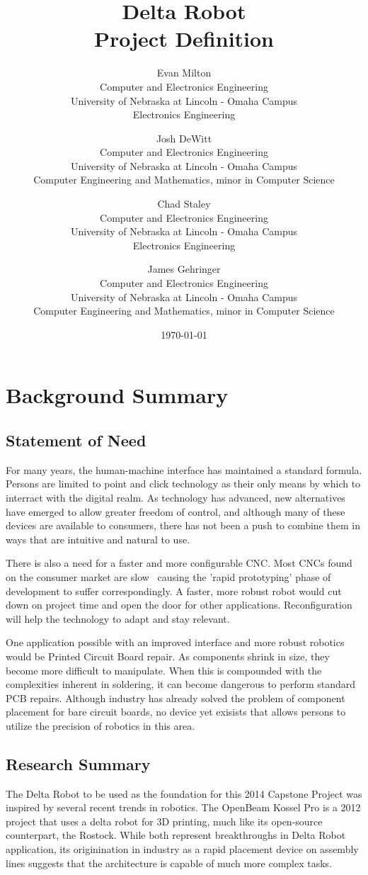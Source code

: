 \documentclass[11pt]{report}
\title{Delta Robot \\ Project Definition}
\author{
	Evan Milton \\
	Computer and Electronics Engineering \\
	University of Nebraska at Lincoln - Omaha Campus \\
	Electronics Engineering
		\and
	Josh DeWitt \\
	Computer and Electronics Engineering \\
	University of Nebraska at Lincoln - Omaha Campus \\
	Computer Engineering and Mathematics, minor in Computer Science
		\and
	Chad Staley \\
	Computer and Electronics Engineering \\
	University of Nebraska at Lincoln - Omaha Campus \\
	Electronics Engineering
		\and
	James Gehringer \\
	Computer and Electronics Engineering \\
	University of Nebraska at Lincoln - Omaha Campus \\
	Computer Engineering and Mathematics, minor in Computer Science
}
\date{\today}
\begin{document}
\maketitle

\tableofcontents

\chapter{Background Summary}
\section{Statement of Need}
\par For many years, the human-machine interface has maintained a standard formula. Persons are limited to point and click technology as their only means by which to interract with the digital realm. As technology has advanced, new alternatives have emerged to allow  greater freedom of control, and although many of these devices are available to consumers, there has not been a push to combine them in ways that are intuitive and natural to use.

\par There is also a need for a faster and more configurable CNC. Most CNCs found on the consumer market are slow~ causing the 'rapid prototyping' phase of development to suffer correspondingly. A faster, more robust robot would cut down on project time and open the door for other applications. Reconfiguration will help the technology to adapt and stay relevant.

\par One application possible with an improved interface and more robust robotics would be Printed Circuit Board repair. As components shrink in size, they become more difficult to manipulate. When this is compounded with the complexities inherent in soldering, it can become dangerous to perform standard PCB repairs. Although industry has already solved the problem of component placement for bare circuit boards, no device yet exisists that allows persons to utilize the precision of robotics in this area. 

\section{Research Summary}
\par The Delta Robot to be used as the foundation for this 2014 Capstone Project was inspired by several recent trends in robotics. The OpenBeam Kossel Pro is a 2012 project that uses a delta robot for 3D printing, much like its open-source counterpart, the Rostock. While both represent breakthroughs in Delta Robot application, its originination in industry as a rapid placement device on assembly lines suggests that the architecture is capable of much more complex tasks.
\end{document}
